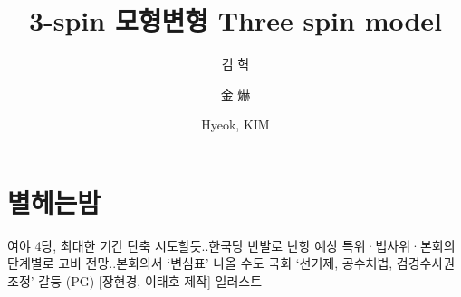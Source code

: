 \documentclass[final,doctor,korean,pdfdoc]{konkukthesis}
\title[korean]{3-spin 모형변형 }
\title[english]{Three spin model}
\title[subtitle]{}
\author[korean]{김 혁}
\author[hanja]{金 爀}
\author[english]{Hyeok, KIM}
\begin{document}
\makecontents
  

\chapter{별헤는밤 }
여야 4당, 최대한 기간 단축 시도할듯..한국당 반발로 난항 예상
특위·법사위·본회의 단계별로 고비 전망..본회의서 `변심표' 나올 수도
국회 `선거제, 공수처법, 검경수사권 조정' 갈등 (PG) [장현경, 이태호 제작] 일러스트
% 
% 
% 
% 
% 
% 
% 
% 
% 
% 
% 
% 
% 
% 
% 
% 
% 
% 
\end{document}
